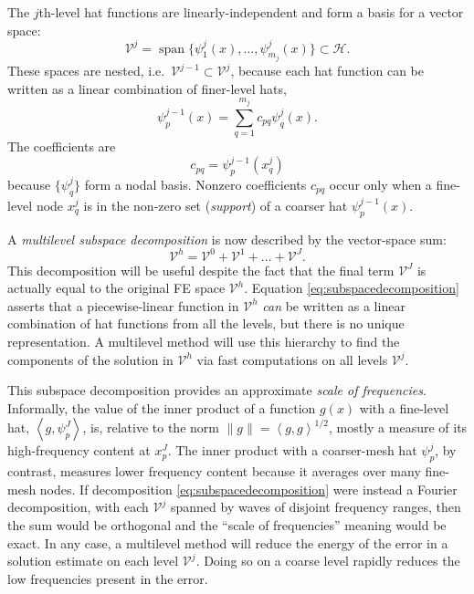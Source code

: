 \documentclass[letterpaper,final,12pt,reqno]{amsart}
\theoremstyle{claim}
\newcommand{\ip}[2]{\left<#1,#2\right>}
\numberwithin{equation}{section}
\numberwithin{figure}{section}
\numberwithin{table}{section}
\numberwithin{theorem}{section}
\begin{document}
The $j$th-level hat functions are linearly-independent and form a basis for a vector space:
\begin{equation}
  \mathcal{V}^j = \operatorname{span}\{\psi_1^j(x),\dots,\psi_{m_j}^j(x)\} \subset \mathcal{H}.  \label{eq:definevk}
\end{equation}
These spaces are nested, i.e.~$\mathcal{V}^{j-1} \subset \mathcal{V}^j$, because each hat function can be written as a linear combination of finer-level hats,
\begin{equation}
   \psi_p^{j-1}(x) = \sum_{q=1}^{m_j} c_{pq} \psi_q^j(x). \label{eq:hatcombination}
\end{equation}
The coefficients are
\begin{equation}
  c_{pq} = \psi_p^{j-1}(x_q^j) \label{eq:nodalcoefficients}
\end{equation}
because $\{\psi_q^j\}$ form a nodal basis.  Nonzero coefficients $c_{pq}$ occur only when a fine-level node $x_q^j$ is in the non-zero set (\emph{support}) of a coarser hat $\psi_p^{j-1}(x)$.

A \emph{multilevel subspace decomposition} is now described by the vector-space sum:
\begin{equation}
  \mathcal{V}^h = \mathcal{V}^0 + \mathcal{V}^1 + \dots + \mathcal{V}^J. \label{eq:subspacedecomposition}
\end{equation}
This decomposition will be useful despite the fact that the final term $\mathcal{V}^J$ is actually equal to the original FE space $\mathcal{V}^h$.  Equation \eqref{eq:subspacedecomposition} asserts that a piecewise-linear function in $\mathcal{V}^h$ \emph{can} be written as a linear combination of hat functions from all the levels, but there is no unique representation.  A multilevel method will use this hierarchy to find the components of the solution in $\mathcal{V}^h$ via fast computations on all levels $\mathcal{V}^j$.

This subspace decomposition provides an approximate \emph{scale of frequencies}.  Informally, the value of the inner product of a function $g(x)$ with a fine-level hat, $\ip{g}{\psi_p^J}$, is, relative to the norm $\|g\| = \ip{g}{g}^{1/2}$, mostly a measure of its high-frequency content at $x_p^J$.  The inner product with a coarser-mesh hat $\psi_p^j$, by contrast, measures lower frequency content because it averages over many fine-mesh nodes.  If decomposition \eqref{eq:subspacedecomposition} were instead a Fourier decomposition, with each $\mathcal{V}^j$ spanned by waves of disjoint frequency ranges, then the sum would be orthogonal and the ``scale of frequencies'' meaning would be exact.  In any case, a multilevel method will reduce the energy of the error in a solution estimate on each level $\mathcal{V}^j$.  Doing so on a coarse level rapidly reduces the low frequencies present in the error.
\end{document}
